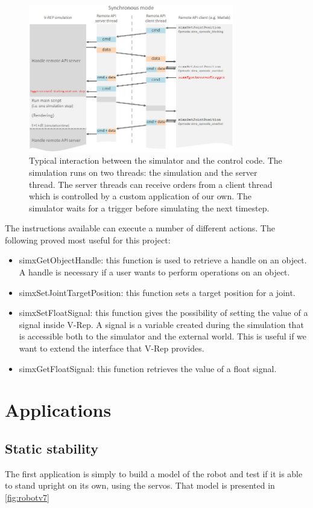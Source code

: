 \begin{figure}[htp]
\centering
\includegraphics[width=0.8\textwidth]{figures/remoteApiSynchronous}
\caption[Simulation interaction]{Typical interaction between the simulator and the control code. The simulation runs on two threads: the simulation and the server thread. The server threads can receive orders from a client thread which is controlled by a custom application of our own. The simulator waits for a trigger before simulating the next timestep.\cite{vrep_manual}}
\label{fig:remoteApi}
\end{figure}

The instructions available can execute a number of different actions. The following proved most useful for this project:\begin{itemize}
\item simxGetObjectHandle: this function is used to retrieve a handle on an object. A handle is necessary if a user wants to perform operations on an object.
\item simxSetJointTargetPosition: this function sets a target position for a joint.
\item simxSetFloatSignal: this function gives the possibility of setting the value of a signal inside V-Rep. A signal is a variable created during the simulation that is accessible both to the simulator and the external world. This is useful if we want to extend the interface that V-Rep provides.
\item simxGetFloatSignal: this function retrieves the value of a float signal. 
\end{itemize}

\section{Applications}
\subsection{Static stability}
The first application is simply to build a model of the robot and test if it is able to stand upright on its own, using the servos. That model is presented in \cref{fig:robotv7}

